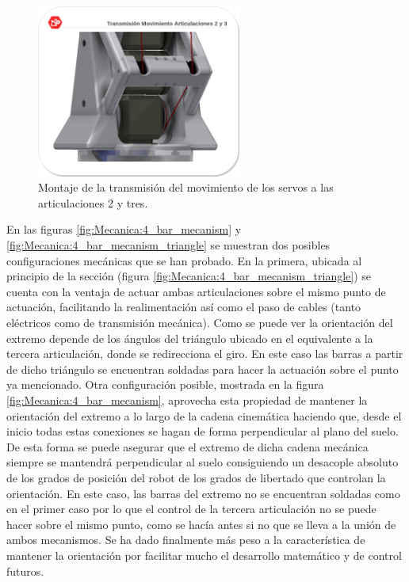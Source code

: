    	\begin{figure}[H]
   		\centering
   		\includegraphics[width=0.6\textwidth]{figuras/Imagenes_Mecanica/TransmisionMotorArticulacion.png}
   		\caption{Montaje de la transmisión del movimiento de los servos a las articulaciones 2 y tres.}
   		\label{fig:Mecanica:transmision_poleas_cuerda}
   	\end{figure}

   	En las figuras \ref{fig:Mecanica:4_bar_mecanism} y \ref{fig:Mecanica:4_bar_mecanism_triangle} se muestran dos posibles configuraciones mecánicas que se han probado. En la primera, ubicada al principio de la sección (figura \ref{fig:Mecanica:4_bar_mecanism_triangle}) se cuenta con la ventaja de actuar ambas articulaciones sobre el mismo punto de actuación, facilitando la realimentación así como el paso de cables (tanto eléctricos como de transmisión mecánica). Como se puede ver la orientación del extremo depende de los ángulos del triángulo ubicado en el equivalente a la tercera articulación, donde se redirecciona el giro. En este caso las barras a partir de dicho triángulo se encuentran soldadas para hacer la actuación sobre el punto ya mencionado. Otra configuración posible, mostrada en la figura \ref{fig:Mecanica:4_bar_mecanism}, aprovecha esta propiedad de mantener la orientación del extremo a lo largo de la cadena cinemática haciendo que, desde el inicio todas estas conexiones se hagan de forma perpendicular al plano del suelo. De esta forma se puede asegurar que el extremo de dicha cadena mecánica siempre se mantendrá perpendicular al suelo consiguiendo un desacople absoluto de los grados de posición del robot de los grados de libertado que controlan la orientación. En este caso, las barras del extremo no se encuentran soldadas como en el primer caso por lo que el control de la tercera articulación no se puede hacer sobre el mismo punto, como se hacía antes si no que se lleva a la unión de ambos mecanismos. Se ha dado finalmente más peso a la característica de mantener la orientación por facilitar mucho el desarrollo matemático y de control futuros.

